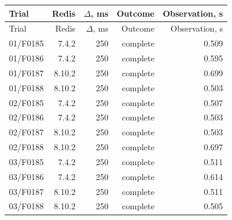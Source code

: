 \begin{longtable}{lrrrr}
\toprule
Trial & Redis & $\Delta$, ms & Outcome & Observation, s\\
\midrule
\endfirsthead
\toprule
Trial & Redis & $\Delta$, ms & Outcome & Observation, s\\
\midrule
\endhead
01/F0185 & 7.4.2 & 250 & complete & 0.509\\
01/F0186 & 7.4.2 & 250 & complete & 0.595\\
01/F0187 & 8.10.2 & 250 & complete & 0.699\\
01/F0188 & 8.10.2 & 250 & complete & 0.503\\
02/F0185 & 7.4.2 & 250 & complete & 0.507\\
02/F0186 & 7.4.2 & 250 & complete & 0.503\\
02/F0187 & 8.10.2 & 250 & complete & 0.503\\
02/F0188 & 8.10.2 & 250 & complete & 0.697\\
03/F0185 & 7.4.2 & 250 & complete & 0.511\\
03/F0186 & 7.4.2 & 250 & complete & 0.614\\
03/F0187 & 8.10.2 & 250 & complete & 0.511\\
03/F0188 & 8.10.2 & 250 & complete & 0.505\\
\bottomrule
\end{longtable}

